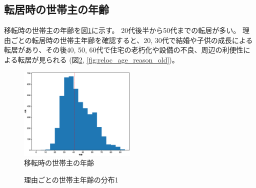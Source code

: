 \documentclass[a4paper,12pt, uplatex]{jsbook}
\begin{document}
\subsection{転居時の世帯主の年齢}
移転時の世帯主の年齢を図\ref{fig:reloc_age}に示す。
20代後半から50代までの転居が多い。
理由ごとの転居時の世帯主年齢を確認すると、20, 30代で結婚や子供の成長による転居があり、その後40, 50, 60代で住宅の老朽化や設備の不良、周辺の利便性による転居が見られる (図\ref{fig:reloc_age_reason_young}, \ref{fig:reloc_age_reason_old})。
%
\begin{figure}[H]
    \centering
    \includegraphics[width=0.5\textwidth]{picture/relocation_age.eps}
    \caption{移転時の世帯主の年齢}
    \label{fig:reloc_age}
\end{figure}
%
\begin{figure}[H]
\centering
{}%
\caption{理由ごとの世帯主年齢の分布1}
\label{fig:reloc_age_reason_young}
\end{figure}
\end{document}
